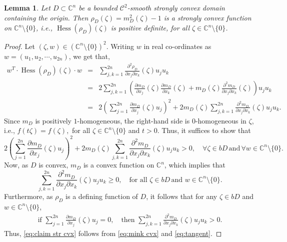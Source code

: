 \documentclass[11pt, oneside, reqno]{amsart}
\numberwithin{equation}{section}
\newtheorem{lemma}[theorem]{Lemma}
\theoremstyle{definition}
\newcommand{\beas}{\begin{eqnarray*}}
\newcommand{\eeas}{\end{eqnarray*}}
\newcommand{\be} {\begin{equation}}
\newcommand{\ee} {\end{equation}}
\newcommand{\bea} {\begin{eqnarray}}
\newcommand{\eea} {\end{eqnarray}}
\newcommand{\cont}{\mathcal C}
\newcommand{\C}{\mathbb C}
\newcommand{\ltt}{\left(}
\newcommand{\rtt}{\right)}
\begin{document}
{%
\begin{lemma}\label{le:str cvx of Minkwski}
Let $D\subset\C^n$ be a bounded $\cont^2$-smooth strongly convex domain containing the origin. Then $\rho_D(\zeta)=m_D^2(\zeta)-1$ is a strongly convex function on $\C^n\setminus\{0\}$, i.e.,
$\operatorname{Hess}(\rho_D)(\zeta)$ is positive definite, for all $\zeta\in\C^n\setminus\{0\}$.
\end{lemma}
\begin{proof}
Let $\ltt \zeta,w\rtt\in \ltt\C^n\setminus\{0\}\rtt^2$. Writing $w$ in real co-ordinates as $w=\ltt u_1,u_2,\cdots,u_{2n}\rtt$, we get that,
\beas
w^T \cdot \operatorname{Hess}(\rho_D)(\zeta)\cdot w &=& 
\sum_{j,k=1}^{2n} \frac{\partial^2\rho_D}{\partial x_j \partial x_k}(\zeta) u_ju_k\\
&=&2\sum_{j,k=1}^{2n} \ltt\frac{\partial m_D}{\partial x_j}(\zeta)\frac{\partial m_D}{\partial x_k}(\zeta)+m_D(\zeta) \frac{\partial^2 m_D}{\partial x_j \partial x_k}(\zeta)\rtt  u_ju_k \\
&=&2\ltt \sum_{j=1}^{2n}\frac{\partial m_D}{\partial x_j}(\zeta) u_j\rtt^2+2m_D(\zeta) \sum_{j,k=1}^{2n}\frac{\partial^2 m_D}{\partial x_j \partial x_k}(\zeta) u_ju_k.
\eeas
Since $m_D$ is positively $1$-homogeneous, the right-hand side is $0$-homogeneous in $\zeta$,  i.e., $f(t\zeta)=f(\zeta),$ for all $\zeta\in\C^n\setminus\{0\}$ and $t>0$. 
Thus, it suffices to show that
\be\label{eq:claim str cvx}
2\ltt \sum_{j=1}^{2n}\frac{\partial m_D}{\partial x_j}(\zeta) u_j\rtt^2+2m_D(\zeta) \sum_{j,k=1}^{2n}\frac{\partial^2 m_D}{\partial x_j \partial x_k}(\zeta) u_ju_k>0,\quad\forall \zeta\in bD\,\text{and}\,\forall w\in\C^n\setminus\{0\}.
\ee
Now, as $D$ is convex, $m_D$ is a convex function on $\C^n$, which implies that 
\be\label{eq:mink cvx}
\sum_{j,k=1}^{2n}\frac{\partial^2 m_D}{\partial x_j \partial x_k}(\zeta) u_ju_k\geq 0,\quad\text{for all } \zeta\in bD\,\text{and } w\in\C^n\setminus\{0\}.
\ee
Furthermore, as $\rho_D$ is a defining function of $D$, it follows that for any $\zeta\in bD$ and $w\in \C^n\setminus\{0\}$, 
\bea\label{eq:tangent}
\text{if }
\sum_{j=1}^{2n}\frac{\partial m_D}{\partial x_j}(\zeta) u_j=0,
\quad \text{then }
\sum_{j,k=1}^{2n}\frac{\partial^2 m_D}{\partial x_j \partial x_k}(\zeta)u_ju_k>0.
\eea
Thus, \eqref{eq:claim str cvx} follows  from \eqref{eq:mink cvx} and \eqref{eq:tangent}.
\end{proof}


}
\end{document}
